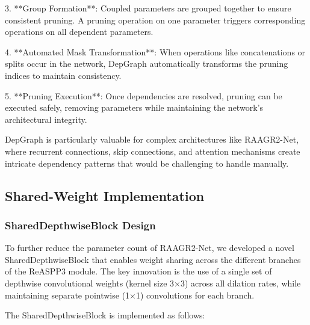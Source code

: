 \documentclass[12pt,a4paper]{article}
\begin{document}
3. **Group Formation**: Coupled parameters are grouped together to ensure consistent pruning. A pruning operation on one parameter triggers corresponding operations on all dependent parameters.

4. **Automated Mask Transformation**: When operations like concatenations or splits occur in the network, DepGraph automatically transforms the pruning indices to maintain consistency.

5. **Pruning Execution**: Once dependencies are resolved, pruning can be executed safely, removing parameters while maintaining the network's architectural integrity.

DepGraph is particularly valuable for complex architectures like RAAGR2-Net, where recurrent connections, skip connections, and attention mechanisms create intricate dependency patterns that would be challenging to handle manually.

\subsection{Shared-Weight Implementation}

\subsubsection{SharedDepthwiseBlock Design}

To further reduce the parameter count of RAAGR2-Net, we developed a novel SharedDepthwiseBlock that enables weight sharing across the different branches of the ReASPP3 module. The key innovation is the use of a single set of depthwise convolutional weights (kernel size 3×3) across all dilation rates, while maintaining separate pointwise (1×1) convolutions for each branch.

The SharedDepthwiseBlock is implemented as follows:
\end{document}
